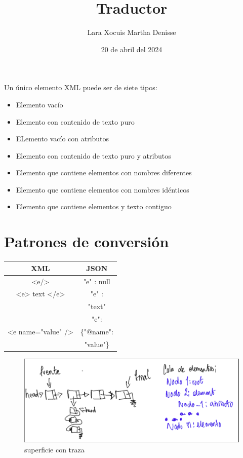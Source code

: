 \documentclass[letterpaper,12pt]{article}
\title {\textbf{Traductor}}
\author{Lara Xocuis Martha Denisse}
\date{20 de abril del 2024}
\begin{document}
\maketitle
\setcounter{page}{1}
\pagestyle{headings}

\begin{sloppypar} 
Un único elemento XML puede ser de siete tipos:
\begin{itemize}
    \item Elemento vacío
    \item Elemento con contenido de texto puro 
    \item ELemento vacío con atributos
    \item Elemento con contenido de texto puro y atributos
    \item Elemento que contiene elementos con nombres diferentes 
    \item Elemento que contiene elementos con nombres idénticos
    \item Elemento que contiene elementos y texto contiguo
\end{itemize}

\section{Patrones de conversión}
\begin{center}
  \begin{tabular}{|c|c|}
      \hline
      \textbf{XML} & \textbf{JSON }\\ \hline 
      <e/> & "e" : null \\ \hline
      <e> text </e> & "e" : \\ 
      & "text" \\ \hline
       & "e": \\ 
       <e name="value" /> & \{"@name": \\  
       & "value"\} \\ \hline
  \end{tabular}
\end{center}

\begin{figure}[H]
  \centering
  \includegraphics[width=0.9\linewidth]{boceto.png}
  \caption{superficie con traza}
\end{figure}

\end{sloppypar}
\end{document}
